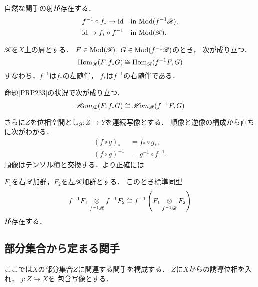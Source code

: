 自然な関手の射が存在する．
\begin{align}
    f^{-1}\circ f_{\ast}\to\mathop{\mathrm{id}}\nolimits&\quad \text{in \(\mathop{\mathrm{Mod}}\nolimits(f^{-1}\mathscr{R})\),}\label{eq234}\\
    \mathop{\mathrm{id}}\nolimits\to f_{\ast}\circ f^{-1}&\quad\text{in \(\mathop{\mathrm{Mod}}\nolimits(\mathscr{R})\).}\label{eq235}
\end{align}

\begin{leftbar}
\begin{PRP}\label{PRP233}
    \(\mathscr{R}\)を\(X\)上の層とする．
    \(F\in\mathop{\mathrm{Mod}}\nolimits(\mathscr{R})\), \(G\in\mathop{\mathrm{Mod}}\nolimits(f^{-1}\mathscr{R})\)のとき，
    次が成り立つ．
    \begin{equation}\label{eq236}
        \mathop{\mathrm{Hom}}\nolimits_{\mathscr{R}}(F,f_{\ast}G)
        \cong
        \mathop{\mathrm{Hom}}\nolimits_{\mathscr{R}}(f^{-1}F,G)
    \end{equation}
    すなわち，\(f^{-1}\)は\(f_{\ast}\)の左随伴，
    \(f_{\ast}\)は\(f^{-1}\)の右随伴である．
\end{PRP}
\end{leftbar}

\begin{leftbar}\begin{CRL}
    命題\ref{PRP233}の状況で次が成り立つ．
    \begin{equation}\label{eq237}
        \mathop{\mathscr{H}\hspace{-2pt}om}\nolimits_{\mathscr{R}}(F,f_{\ast}G)
        \cong
        \mathop{\mathscr{H}\hspace{-2pt}om}\nolimits_{\mathscr{R}}(f^{-1}F,G)
    \end{equation}
\end{CRL}\end{leftbar}
    
さらに\(Z\)を位相空間とし\(g\colon Z\to Y\)を連続写像とする．
順像と逆像の構成から直ちに次がわかる．
\begin{align}
    \left(f\circ g\right)_{\ast}&=f_{\ast}\circ g_{\ast},\label{eq238}\\
    \left(f\circ g\right)^{-1}&=g^{-1}\circ f^{-1}.\label{eq239}
\end{align}
順像はテンソル積と交換する．より正確には
\begin{leftbar}\begin{PRP}
    \(F_1\)を右\(\mathscr{R}\)加群，\(F_2\)を左\(\mathscr{R}\)加群とする．
    このとき標準同型
    \begin{equation}
        f^{-1}F_1\ttens[f^{-1}\scR]f^{-1}F_2\cong
        f^{-1}\left(F_1\ttens[f^{-1}\scR]F_2\right)
    \end{equation}
    が存在する．
\end{PRP}\end{leftbar}
    

\subsection*{部分集合から定まる関手}
ここでは\(X\)の部分集合\(Z\)に関連する関手を構成する．
\(Z\)に\(X\)からの誘導位相を入れ，
\(j\colon Z\hookrightarrow X\)を
包含写像とする．
